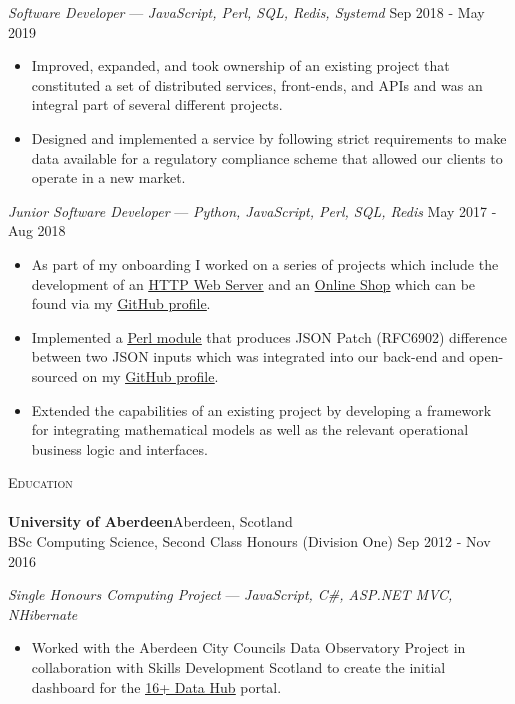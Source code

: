 \documentclass[a4paper]{article}
\newcommand{\lineunder} {
    \vspace*{-8pt} \\
    \hspace*{-18pt} \hrulefill \\
}
\newcommand{\header} [1] {
    {\hspace*{-18pt}\vspace*{6pt} \textsc{#1}}
    \vspace*{-6pt} \lineunder
}
\begin{document}
\textit{Software Developer}  — {\sl JavaScript, Perl, SQL, Redis, Systemd} \hfill Sep 2018 - May 2019\\
\vspace{-1mm}
\begin{itemize} \itemsep 1pt
    \item Improved, expanded, and took ownership of an existing project that constituted a set of distributed services, front-ends, and APIs and was an integral part of several different projects.
    \item Designed and implemented a service by following strict requirements to make data available for a regulatory compliance scheme that allowed our clients to operate in a new market.
\end{itemize}

\textit{Junior Software Developer} — {\sl Python, JavaScript, Perl, SQL, Redis} \hfill May 2017 - Aug 2018\\
\vspace{-1mm}
\begin{itemize} \itemsep 1pt
    \item As part of my onboarding I worked on a series of projects which include the development of an \href{https://github.com/velislavgerov/exercise02}{\underline{HTTP Web Server}} and an \href{https://github.com/velislavgerov/exercise03}{\underline{Online Shop}} which can be found via my \href{https://github.com/velislavgerov}{\underline{GitHub profile}}.
    \item Implemented a \href{https://github.com/velislavgerov/telebid-hackschool/tree/master/perl-json-diff}{\underline{Perl module}} that produces JSON Patch (RFC6902) difference between two JSON inputs which was integrated into our back-end and open-sourced on my \href{https://github.com/velislavgerov}{\underline{GitHub profile}}.
    \item Extended the capabilities of an existing project by developing a framework for integrating mathematical models as well as the relevant operational business logic and interfaces.
\end{itemize}

\header{Education}
\textbf{University of Aberdeen}\hfill Aberdeen, Scotland\\
BSc Computing Science, Second Class Honours (Division One) \hfill Sep 2012 - Nov 2016\\
\vspace*{2mm}

{\textit{Single Honours Computing Project}} — {\sl JavaScript, C\#, ASP.NET MVC, NHibernate}\
\vspace{-1mm}
\begin{itemize} \itemsep 1pt
    \item Worked with the Aberdeen City Council\textquotesingle{}s Data Observatory Project in collaboration with Skills Development Scotland to create the initial dashboard for the \href{https://www.skillsdevelopmentscotland.co.uk/what-we-do/scotlands-careers-services/16plus-data-hub/}{\underline{16+ Data Hub}} portal.\\
\end{itemize}
\end{document}
